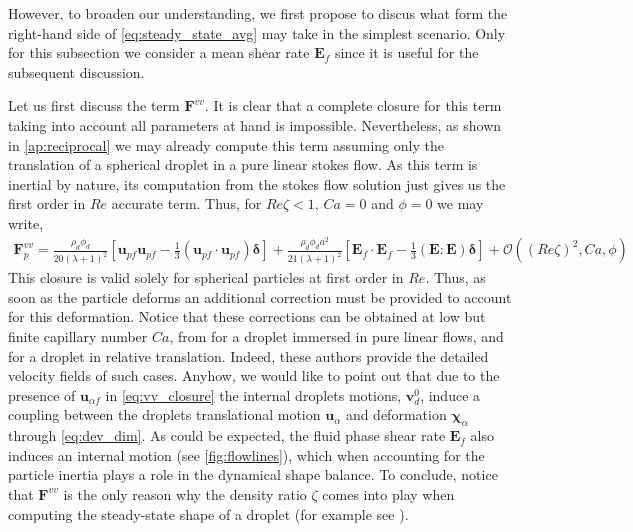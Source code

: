 However, to broaden our understanding, we first propose to discus what form the right-hand side of \ref{eq:steady_state_avg} may take in the simplest scenario. 
Only for this subsection we consider a mean shear rate $\textbf{E}_f$ since it is useful for the subsequent discussion. 

Let us first discuss the term $\textbf{F}^{vv}$. 
It is clear that a complete closure for this term taking into account all parameters at hand is impossible. 
Nevertheless, as shown in \ref{ap:reciprocal} we may already compute this term assuming only the translation of a spherical droplet in a pure linear stokes flow. 
As this term is inertial by nature, its computation from the stokes flow solution just gives us the first order in $Re$ accurate term.
Thus, for $Re \zeta < 1$, $Ca = 0$ and $\phi = 0$ we may write,
\begin{align}
    \textbf{F}^{vv}_p
    = \frac{\rho_d \phi_d}{20(\lambda +1 )^2}
    \left[
        \textbf{u}_{p f}\textbf{u}_{p f} 
    -\frac{1}{3} (\textbf{u}_{p f}\cdot \textbf{u}_{p f})\bm\delta
    \right]
    + \frac{\rho_d \phi_d a^2}{21 (\lambda + 1)^2}[\textbf{E}_f\cdot \textbf{E}_f - \frac{1}{3}(\textbf{E}:\textbf{E})\bm\delta]
    + \mathcal{O}((Re\zeta)^2,Ca, \phi)
    \label{eq:vv_closure}
\end{align}
This closure is valid solely for spherical particles at first order in $Re$. 
Thus, as soon as the particle deforms an additional correction must be provided to account for this deformation. 
Notice that these corrections can be obtained at low but finite capillary number $Ca$, from \citet{leal2007advanced} for a droplet immersed in pure linear flows, and \citet{taylor1964deformation} for a droplet in relative translation. 
Indeed, these authors provide the detailed velocity fields of such cases. 
Anyhow, we would like to point out that due to the presence of $\textbf{u}_{\alpha f}$ in \ref{eq:vv_closure} the internal droplets motions, $\textbf{v}_d^0$, induce a coupling between the droplets translational motion $\textbf{u}_\alpha$ and deformation $\bm\chi_\alpha$ through \ref{eq:dev_dim}. 
As could be expected, the fluid phase shear rate $\textbf{E}_f$ also induces an internal motion (see \ref{fig:flowlines}), which when accounting for the particle inertia plays a role in the dynamical shape balance.  
To conclude, notice that $\textbf{F}^{vv}$ is the only reason why the density ratio $\zeta$ comes into play when computing the steady-state shape of a droplet (for example see \citet{taylor1964deformation}). 

